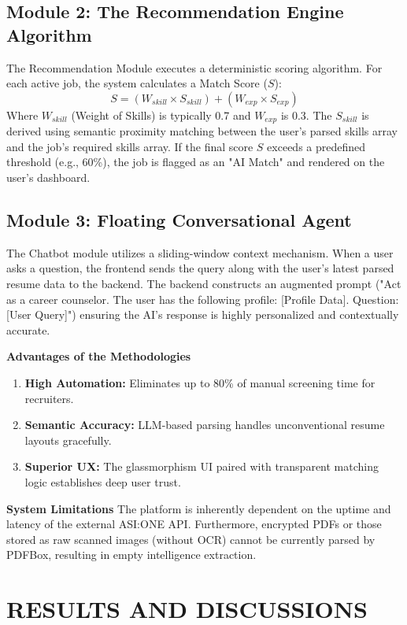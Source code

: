\documentclass[12pt]{report}
\begin{document}
\section{Module 2: The Recommendation Engine Algorithm} 
The Recommendation Module executes a deterministic scoring algorithm. For each active job, the system calculates a Match Score ($S$):
$$ S = (W_{skill} \times S_{skill}) + (W_{exp} \times S_{exp}) $$
Where $W_{skill}$ (Weight of Skills) is typically 0.7 and $W_{exp}$ is 0.3. The $S_{skill}$ is derived using semantic proximity matching between the user's parsed skills array and the job's required skills array. If the final score $S$ exceeds a predefined threshold (e.g., 60\%), the job is flagged as an "AI Match" and rendered on the user's dashboard.

\section{Module 3: Floating Conversational Agent} 
The Chatbot module utilizes a sliding-window context mechanism. When a user asks a question, the frontend sends the query along with the user's latest parsed resume data to the backend. The backend constructs an augmented prompt ("Act as a career counselor. The user has the following profile: [Profile Data]. Question: [User Query]") ensuring the AI's response is highly personalized and contextually accurate.

\textbf{Advantages of the Methodologies} 
\begin{enumerate}
    \item \textbf{High Automation:} Eliminates up to 80\% of manual screening time for recruiters.
    \item \textbf{Semantic Accuracy:} LLM-based parsing handles unconventional resume layouts gracefully.
    \item \textbf{Superior UX:} The glassmorphism UI paired with transparent matching logic establishes deep user trust.
\end{enumerate}

\textbf{System Limitations} 
The platform is inherently dependent on the uptime and latency of the external ASI:ONE API. Furthermore, encrypted PDFs or those stored as raw scanned images (without OCR) cannot be currently parsed by PDFBox, resulting in empty intelligence extraction.


\chapter{RESULTS AND DISCUSSIONS} 
\linespread{1.5}\selectfont 
\end{document}
